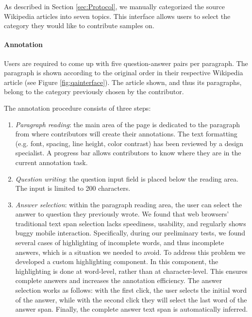 \documentclass[10pt, a4paper]{article}
\begin{document}
As described in Section \ref{sec:Protocol}, we manually categorized the source Wikipedia articles into seven topics. This interface allows users to select the category they would like to contribute samples on.

\paragraph{Annotation}

Users are required to come up with five question-answer pairs per paragraph. The paragraph is shown according to the original order in their respective Wikipedia article (see Figure \ref{fig:qainterface}). The article shown, and thus its paragraphs, belong to the category previously chosen by the contributor.

The annotation procedure consists of three steps:
\begin{enumerate}
\item \textit{Paragraph reading}: the main area of the page is dedicated to the paragraph from where contributors will create their annotations. The text formatting (e.g. font, spacing, line height, color contrast) has been reviewed by a design specialist. A progress bar allows contributors to know where they are in the current annotation task. 

\item \textit{Question writing}: the question input field is placed below the reading area. The input is limited to 200 characters.

\item \textit{Answer selection}: within the paragraph reading area, the user can select the answer to question they previously wrote. We found that web browsers' traditional text span selection lacks speediness, usability, and regularly shows buggy mobile interaction. Specifically, during our preliminary tests, we found several cases of highlighting of incomplete words, and thus incomplete answers, which is a situation we needed to avoid. To address this problem we developed a custom highlighting component. In this component, the highlighting is done at word-level, rather than at character-level. This ensures complete answers and increases the annotation efficiency. The answer selection works as follows: with the first click, the user  selects the initial word of the answer, while with the second click they will select the last word of the answer span. Finally, the complete answer text span is automatically inferred.
\end{enumerate}
\end{document}
